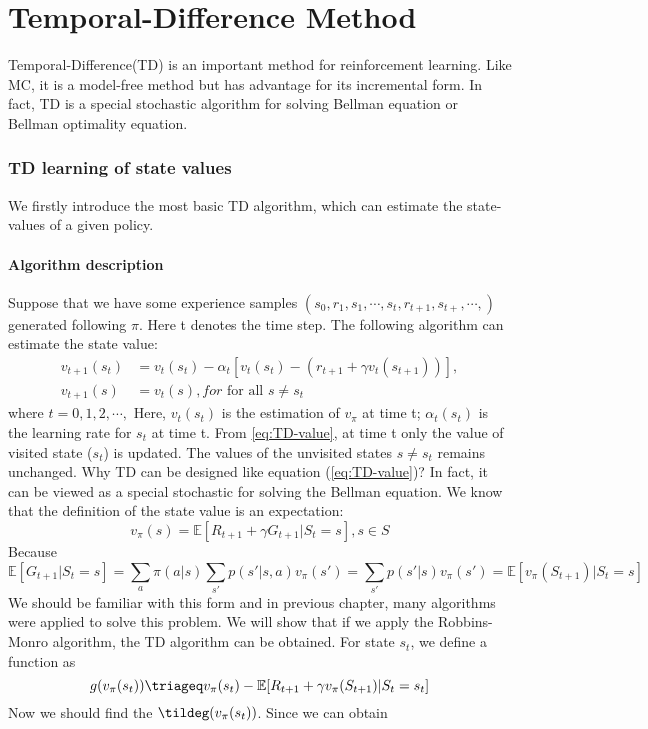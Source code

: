 \part{Temporal-Difference Method} Temporal-Difference(TD) is an important method for reinforcement learning. Like MC, it
is a model-free method but has advantage for its incremental form. In fact, TD is a special stochastic algorithm for
solving Bellman equation or Bellman optimality equation.

\section{TD learning of state values}
We firstly introduce the most basic TD algorithm, which can estimate the state-values of a given policy.
 \subsection{Algorithm description}
 Suppose that we have some experience samples $(s_{0},r_{1},s_{1},\cdots,s_{t},r_{t+1},s_{t+},\cdots,)$ generated following $\pi$. Here t denotes the time step. The following algorithm can 
estimate the state value:
\begin{align}\label{eq:TD-value}
  v_{t+1}(s_{t}) &= v_{t}(s_{t}) - \alpha_{t}\left[v_{t}(s_{t})-\left(r_{t+1}+\gamma v_{t}(s_{t+1})\right)\right], \\
  v_{t+1}(s) &= v_{t}(s), for \text{ for all }  s\neq s_{t}
\end{align}
where $t=0,1,2,\cdots,$ Here, $v_{t}(s_{t})$ is the estimation of $v_{\pi}$ at time t; $\alpha_{t}(s_{t})$ is the learning rate for $s_{t}$ at time t.
From \ref{eq:TD-value}, at time t only the value of visited state ($s_{t}$) is updated. The values of the unvisited states $s\neq s_{t}$ remains unchanged.
Why TD can be designed like equation (\ref{eq:TD-value})? In fact, it can be viewed as a special stochastic for solving the Bellman equation. We know that the definition of the state value is an expectation:
\begin{equation*}
    v_{\pi}(s) = \mathbb{E}\left[R_{t+1}+\gamma G_{t+1}|S_{t}=s\right], s\in S
\end{equation*}
Because
\begin{equation*}
    \mathbb{E}\left[G_{t+1}|S_{t}=s\right] = \sum_{a} \pi(a|s)\sum_{s'}p(s'|s,a)v_{\pi}(s') = \sum_{s'}p(s'|s)v_{\pi}(s') = \mathbb{E}[v_{\pi}(S_{t+1})|S_{t}=s]
\end{equation*}
We should be familiar with this form and in previous chapter, many algorithms were applied to solve this problem. We will show that if we apply the Robbins-Monro algorithm, the TD algorithm can be obtained.
For state $s_{t}$, we define a function as 
\begin{equation*}
    g(v_{\pi}(s_{t})) \triageq v_{\pi}(s_{t}) - \mathbb{E}[R_{t+1}+\gamma v_{\pi}(S_{t+1})|S_{t}=s_{t}]
\end{equation*}
Now we should find the $\tildeg(v_{\pi}(s_{t}))$. Since we can obtain 
